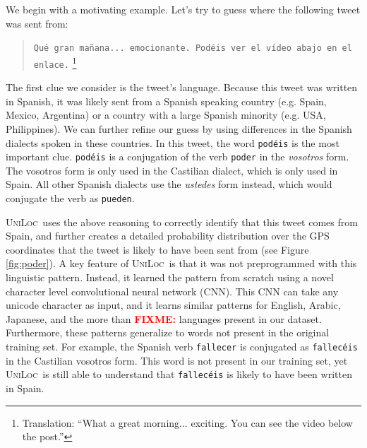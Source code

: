 \documentclass[sigconf,10pt]{acmart}
\newcommand{\str}[1]{\texttt{#1}}
\newcommand{\defn}[1]{\textit{#1}}
\newcommand{\fixme}[1]{\textcolor{red}{\textbf{FIXME:} {#1}}}
\newcommand{\uniloc}{\textsc{UniLoc}}
\begin{document}
We begin with a motivating example.
Let's try to guess where the following tweet was sent from:
\begin{quote}
    \str{Qu\'e gran ma\~nana... emocionante.  Pod\'eis ver el v\'ideo abajo en el enlace.}%
\footnote{Translation: ``What a great morning... exciting.  You can see the video below the post.''}
\end{quote}
%
%
The first clue we consider is the tweet's language.
Because this tweet was written in Spanish,
it was likely sent from a Spanish speaking country (e.g. Spain, Mexico, Argentina) 
or a country with a large Spanish minority (e.g. USA, Philippines).
We can further refine our guess by using differences in the Spanish dialects spoken in these countries.
In this tweet, the word \str{pod\'eis} is the most important clue.
\str{pod\'eis} is a conjugation of the verb \str{poder} in the \defn{vosotros} form.
The vosotros form is only used in the Castilian dialect,
which is only used in Spain.
All other Spanish dialects use the \defn{ustedes} form instead, 
which would conjugate the verb as \str{pueden}.

\uniloc\ uses the above reasoning to correctly identify that this tweet comes from Spain,
and further creates a detailed probability distribution over the GPS coordinates that the tweet is likely to have been sent from
(see Figure \ref{fig:poder}).
A key feature of \uniloc\ is that it was not preprogrammed with this linguistic pattern.
Instead, it learned the pattern from scratch using a novel character level convolutional neural network (CNN). 
This CNN can take any unicode character as input,
and it learns similar patterns for English, Arabic, Japanese, and the more than \fixme{} languages present in our dataset.
Furthermore, these patterns generalize to words not present in the original training set.
For example, the Spanish verb \str{fallecer} is conjugated as \str{fallec\'eis} in the Castilian vosotros form.
This word is not present in our training set,
yet \uniloc\ is still able to understand that \str{fallec\'eis} is likely to have been written in Spain.
\end{document}
